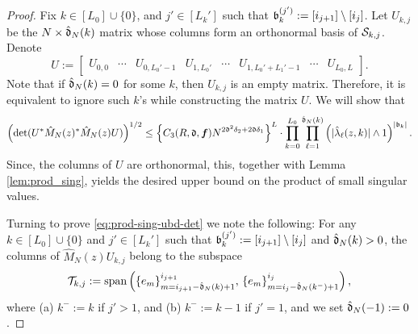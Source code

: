 \documentclass{amsart}
\numberwithin{equation}{section}
\def\corEE{\textcolor{amethyst}}
\def\corEE{}
\def\corAB{}
\begin{document}
\begin{proof}
Fix $k \in [L_0] \cup\{0\}$, and $j' \in [L_k']$ such that $\mathfrak{b}_k^{(j')}:=[i_{j+1}]\setminus [i_j]$. Let $U_{k,j}$ be the $N \times \hat{\mathfrak{d}}_N(k)$ matrix whose columns form an orthonormal basis of $\mathcal{S}_{k,j}$. Denote
\begin{equation}\label{eq:dfn-onb}
U:= \begin{bmatrix} U_{0,0} & \cdots & U_{0,L_0'-1} & U_{1, L_0'} &\cdots & U_{1,L_0'+L_1'-1}&  \cdots & U_{L_0, L} \end{bmatrix}.
\end{equation}
Note that if $\hat{\mathfrak{d}}_N(k) =0$ for some $k$, then $U_{k,j}$ is an empty matrix. Therefore, it is equivalent to ignore such $k$'s while constructing the matrix $U$. We will show that
\begin{equation}\label{eq:prod-sing-ubd-det}
\left(\det(U^*\hat{M}_N(z)^* \hat{M}_N(z) U)\right)^{1/2} \le   \left\{C_3(R,\gd, {\bm f}) N^{\corEE{2\gd^2 \delta_2+2\gd \delta_1}}\right\}^L \cdot \prod_{k=0}^{L_0} \prod_{\ell=1}^{\hat\gd_N(k)} \left(|\hat{\lambda}_\ell(z,k)| \wedge 1\right)^{|\gb_k|}.
\end{equation}
Since, the columns of $U$ are orthonormal, this, together with Lemma \ref{lem:prod_sing}, yields the desired upper bound on the product of small singular values.

Turning to prove \eqref{eq:prod-sing-ubd-det} we note the following: For any $k \in [L_0]\cup\{0\}$ and $j' \in [L_k']$ such that $\mathfrak{b}_k^{(j')}:=[i_{j+1}]\setminus [i_j]$ and $\hat{\mathfrak{d}}_N(k)>0$, the columns of $\hat{M}_N(z) U_{k,j}$ belong to the subspace
$$\mathcal{T}_{k,j}:=\operatorname{span}\left(\{e_{m}\}_{m=i_{j+1}-\hat{\mathfrak{d}}_N(k)+1}^{i_{j+1}}, \, \{e_{m}\}_{m=i_{j}-\hat{\mathfrak{d}}_N(k^-)+1}^{i_{j}}\right),$$
where (a) $k^-:=k$ if $j'>1$, and (b) $k^-:=k-1$ if $j'=1$, \corAB{and we set} $\hat{\mathfrak{d}}_N(-1):=0$.


\end{proof}
\end{document}

